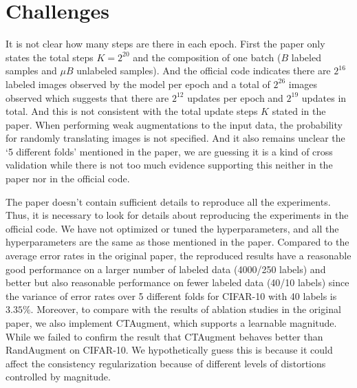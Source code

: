 \section{Challenges}
It is not clear how many steps are there in each epoch. First the paper only states the total steps $K=2^{20}$ and the composition of one batch ($B$ labeled samples and $\mu B$ unlabeled samples). And the official code indicates there are $2^{16}$ labeled images observed by the model per epoch and a total of $2^{26}$ images observed which suggests that there are $2^{12}$ updates per epoch and $2^{19}$ updates in total. And this is not consistent with the total update steps $K$ stated in the paper. When performing weak augmentations to the input data, the probability for randomly translating images is not specified. And it also remains unclear the `5 different folds' mentioned in the paper, we are guessing it is a kind of cross validation while there is not too much evidence supporting this neither in the paper nor in the official code.

The paper doesn't contain sufficient details to reproduce all the experiments. Thus, it is necessary to look for details about reproducing the experiments in the official code. We have not optimized or tuned the hyperparameters, and all the hyperparameters are the same as those mentioned in the paper. 
Compared to the average error rates in the original paper, the reproduced results have a reasonable good performance on a larger number of labeled data (4000/250 labels) and better but also reasonable performance on fewer labeled data (40/10 labels) since the variance of error rates over 5 different folds for CIFAR-10 with 40 labels is $3.35\%$. 
Moreover, to compare with the results of ablation studies in the original paper, we also implement CTAugment, which supports a learnable magnitude. While we failed to confirm the result that CTAugment behaves better than RandAugment on CIFAR-10. We hypothetically guess this is because it could affect the consistency regularization because of different levels of distortions controlled by magnitude. 